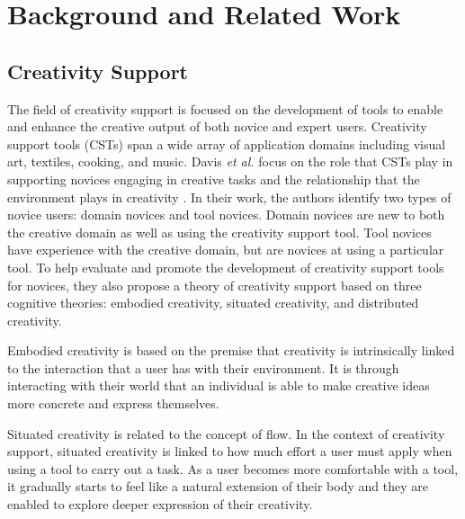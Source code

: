 


\section{Background and Related Work}
\subsection{Creativity Support}
The field of creativity support is focused on the development of tools to enable and enhance the creative output of both novice and expert users. Creativity support tools (CSTs) span a wide array of application domains including visual art, textiles, cooking, and music. Davis \textit{et al.} focus on the role that CSTs play in supporting novices engaging in creative tasks and the relationship that the environment plays in creativity \cite{davis2013toward}. In their work, the authors identify two types of novice users: domain novices and tool novices. Domain novices are new to both the creative domain as well as using the creativity support tool. Tool novices have experience with the creative domain, but are novices at using a particular tool. To help evaluate and promote the development of creativity support tools for novices, they also propose a theory of creativity support based on three cognitive theories: embodied creativity, situated creativity, and distributed creativity.

Embodied creativity is based on the premise that creativity is intrinsically linked to the interaction that a user has with their environment. It is through interacting with their world that an individual is able to make creative ideas more concrete and express themselves.

Situated creativity is related to the concept of flow. In the context of creativity support, situated creativity is linked to how much effort a user must apply when using a tool to carry out a task. As a user becomes more comfortable with a tool, it gradually starts to feel like a natural extension of their body and they are enabled to explore deeper expression of their creativity.

